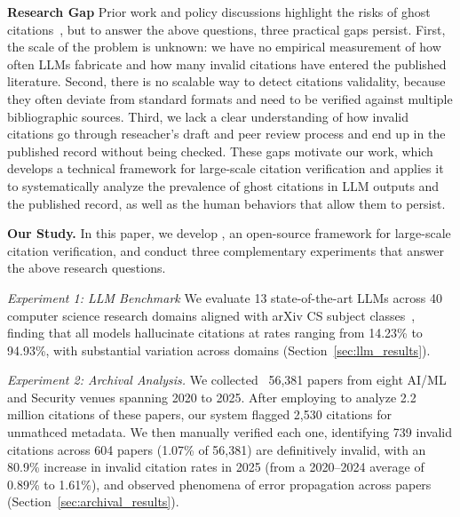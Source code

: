 \noindent
\textbf{Research Gap}
Prior work and policy discussions highlight the risks of ghost citations~\cite{chairs2025iclr,thorp2023chatgpt,oladokun2025hallucitation}, but to answer the above questions, three practical gaps persist.
First, the scale of the problem is unknown: we have no empirical measurement of how often LLMs fabricate and how many invalid citations have entered the published literature.
Second, there is no scalable way to detect citations validality, because they often deviate from standard formats and need to be verified against multiple bibliographic sources.
Third, we lack a clear understanding of how invalid citations go through reseacher's draft and peer review process and end up in the published record without being checked.
These gaps motivate our work, which develops a technical framework for large-scale citation verification and applies it to systematically analyze the prevalence of ghost citations in LLM outputs and the published record, as well as the human behaviors that allow them to persist.


\noindent
\textbf{Our Study.}
In this paper, we develop \citeb, 
an open-source framework for large-scale citation verification, and conduct three complementary experiments that answer the above research questions.

\textit{Experiment 1: LLM Benchmark}
We evaluate 13 state-of-the-art LLMs across 40 computer science research domains aligned with arXiv CS subject classes~\cite{arxivCSClasses}, finding that all models hallucinate citations at rates ranging from 14.23\% to 94.93\%, with substantial variation across domains (Section~\ref{sec:llm_results}).

\textit{Experiment 2: Archival Analysis.}
We collected~\cite{bailey2012menlo} 56,381 papers from eight AI/ML and Security venues spanning 2020 to 2025. After employing \citeb to analyze 2.2 million citations of these papers, our system flagged 2,530 citations for unmathced metadata.
We then manually verified each one, identifying 739 invalid citations across 604 papers (1.07\% of 56,381) are definitively invalid, with an 80.9\% increase in invalid citation rates in 2025 (from a 2020--2024 average of 0.89\% to 1.61\%), and observed phenomena of error propagation across papers (Section~\ref{sec:archival_results}).

